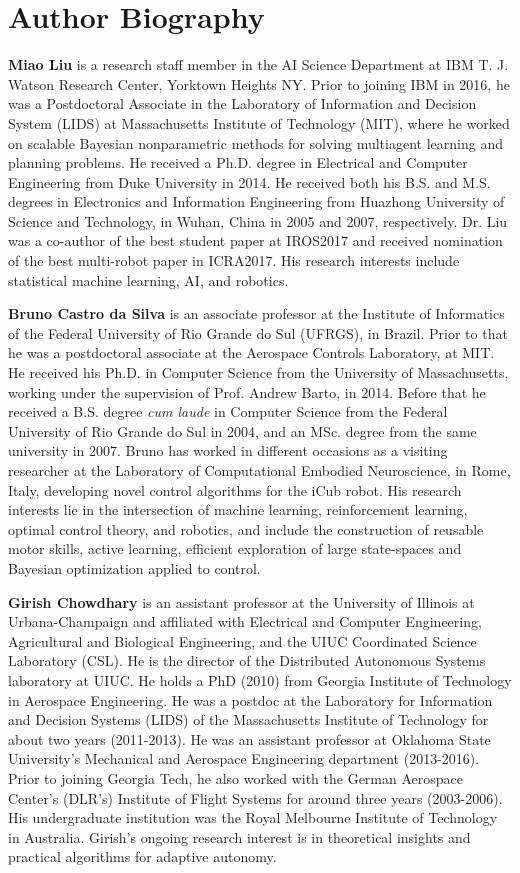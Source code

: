\documentclass[letterpaper,12pt,peerreviewca,draftcls]{IEEEtran}
\begin{document}
\section{Author Biography}
\noindent \textbf{Miao Liu} is a research staff member in the AI Science Department at IBM T. J. Watson Research Center, Yorktown Heights NY. Prior to joining IBM in 2016, he was a Postdoctoral Associate in the Laboratory of Information and Decision System (LIDS) at Massachusetts Institute of Technology (MIT), where he worked on scalable Bayesian nonparametric methods for solving multiagent learning and planning problems. He received a Ph.D. degree in Electrical and Computer Engineering from Duke University in 2014. He received both his B.S. and M.S. degrees in Electronics and Information Engineering from Huazhong University of Science and Technology, in Wuhan, China in 2005 and 2007, respectively. Dr. Liu was a co-author of the best student paper at IROS2017 and received nomination of the best multi-robot paper in ICRA2017. His research interests include statistical machine learning, AI, and robotics.

\noindent \textbf{Bruno Castro da Silva} is an associate professor at the Institute of Informatics of the Federal University of Rio Grande do Sul (UFRGS), in Brazil. Prior to that he was a postdoctoral associate at the Aerospace Controls Laboratory, at MIT. He received his Ph.D. in Computer Science from the University of Massachusetts, working under the supervision of Prof. Andrew Barto, in 2014. Before that he received a B.S. degree \emph{cum laude} in Computer Science from the Federal University of Rio Grande do Sul in 2004, and an MSc. degree from the same university in 2007. Bruno has worked in different occasions as a visiting researcher at the Laboratory of Computational Embodied Neuroscience, in Rome, Italy, developing novel control algorithms for the iCub robot. His research interests lie in the intersection of machine learning, reinforcement learning, optimal control theory, and robotics, and include the construction of reusable motor skills, active learning, efficient exploration of large state-spaces and Bayesian optimization applied to control.


\noindent \textbf{Girish Chowdhary} is an assistant professor at the University of Illinois at Urbana-Champaign and affiliated with Electrical and Computer Engineering, Agricultural and Biological Engineering, and the UIUC Coordinated Science Laboratory (CSL). He is the director of the Distributed Autonomous Systems laboratory at UIUC. He holds a PhD (2010) from Georgia Institute of Technology in Aerospace Engineering. He was a postdoc at the Laboratory for Information and Decision Systems (LIDS) of the Massachusetts Institute of Technology for about two years (2011-2013). He was an assistant professor at Oklahoma State University’s Mechanical and Aerospace Engineering department (2013-2016). Prior to joining Georgia Tech, he also worked with the German Aerospace Center's (DLR's) Institute of Flight Systems for around three years (2003-2006). His undergraduate institution was the Royal Melbourne Institute of Technology in Australia. Girish's ongoing research interest is in theoretical insights and practical algorithms for adaptive autonomy. 
\end{document}
